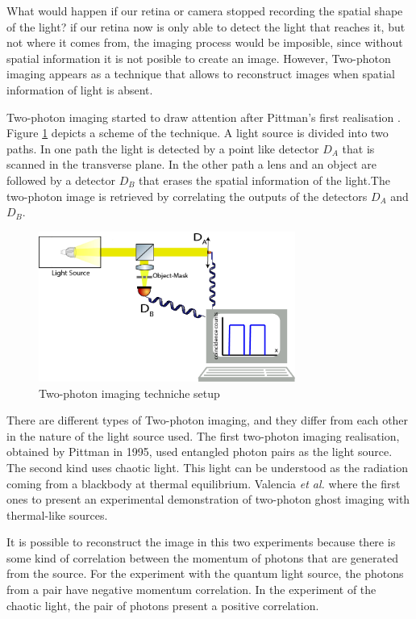 What would happen if our retina or camera stopped recording the spatial shape of the light? if our retina now is 
only able to detect the light that reaches it, but not where it comes from, 
the imaging process would be imposible, since without spatial information it is not posible to create an image.
However, Two-photon imaging appears as a technique that allows to reconstruct images when spatial information of light is absent. 

Two-photon imaging started to draw attention after Pittman's first realisation \cite{pittman}. Figure \ref{fig:twoPh} depicts a scheme of the technique.
 A light source is divided into two paths. In one path the light is detected by a point like detector $D_A$
that is scanned in the transverse plane. In the other path a lens and an object are followed by a detector $D_B$ that erases the spatial information
 of the light.The two-photon image is retrieved by correlating the outputs of the detectors $D_A$ and $D_B$. 





\begin{figure}[h]
\centering
\includegraphics[width=0.75\textwidth]{Figures/twoPhotonSetup.png}
\caption{Two-photon imaging techniche setup} 
\label{fig:twoPh}
\end{figure}

There are different types of Two-photon imaging, and they differ from each other in the nature of the light 
source used. The first two-photon imaging realisation, obtained by Pittman in 1995\cite{pittman}, 
used entangled photon pairs as the light source. The second kind uses chaotic light. 
This light can be understood as the radiation coming from a blackbody at thermal equilibrium. 
Valencia \textit{et al.} where the first ones to present an experimental demonstration 
of two-photon ghost imaging with thermal-like sources\cite{thermalAlejandra}.

It is possible to reconstruct the image in this two experiments because there is some kind of 
correlation between the momentum of photons that are generated from the source. For the experiment with the quantum light source, the photons from a pair have negative momentum correlation.
In the experiment of the chaotic light, the pair of photons present a positive correlation\cite{positiveCorre}. 

